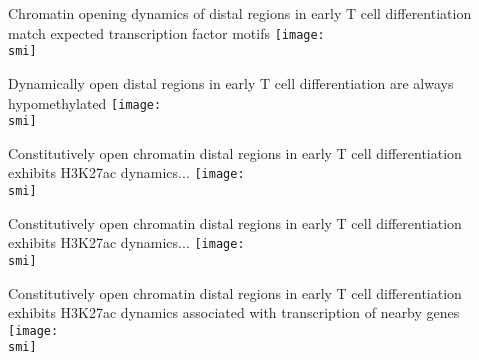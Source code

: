 \documentclass[10pt, usenames, dvipsnames]{beamer}
\def\smi{out/ln/updir/mw-gcthesis-oral/library.bib}
\begin{document}
\begin{frame}{Chromatin opening dynamics of distal regions in early T cell differentiation match expected transcription factor motifs} 
  \def\smi{out/ln/updir/mw-gcthesis-oral/ink/atac-clusters/atac-motifs.pdf}
  \texttt{[image: \\smi]}
\end{frame}
\begin{frame}{Dynamically open distal regions in early T cell differentiation are always hypomethylated}
  \def\smi{out/ln/updir/mw-gcthesis-oral/ink/atac-clusters/atac-wgbs.pdf}
  \texttt{[image: \\smi]}
\end{frame}
\begin{frame}{Constitutively open chromatin distal regions in early T cell differentiation exhibits H3K27ac dynamics...}
  \def\smi{out/ln/updir/mw-gcthesis-oral/ink/atac-clusters/atac-wgbs-h3k27ac.pdf}
  \texttt{[image: \\smi]}
\end{frame}
\begin{frame}{Constitutively open chromatin distal regions in early T cell differentiation exhibits H3K27ac dynamics...}
  \def\smi{out/ln/updir/mw-gcthesis-oral/ink/atac-clusters/only-h3k27ac-only-casero.pdf}
  \texttt{[image: \\smi]}
\end{frame}
\begin{frame}{Constitutively open chromatin distal regions in early T cell differentiation exhibits H3K27ac dynamics associated with transcription of nearby genes}
  \def\smi{out/ln/updir/mw-gcthesis-oral/ink/atac-clusters/rnaseq-h3k27ac-only-casero.pdf}
  \texttt{[image: \\smi]}
\end{frame}
\end{document}

